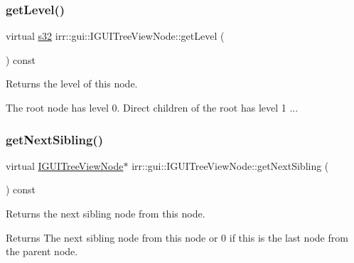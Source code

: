 \subsubsection{\texorpdfstring{get\+Level()}{getLevel()}}
{\footnotesize\ttfamily virtual \hyperlink{namespaceirr_ac66849b7a6ed16e30ebede579f9b47c6}{s32} irr\+::gui\+::\+I\+G\+U\+I\+Tree\+View\+Node\+::get\+Level (\begin{DoxyParamCaption}{ }\end{DoxyParamCaption}) const\hspace{0.3cm}{\ttfamily [pure virtual]}}



Returns the level of this node. 

The root node has level 0. Direct children of the root has level 1 ... \mbox{\label{classirr_1_1gui_1_1IGUITreeViewNode_a5f54e1386055ad0b45775ebefb1b5600}} 
\subsubsection{\texorpdfstring{get\+Next\+Sibling()}{getNextSibling()}}
{\footnotesize\ttfamily virtual \hyperlink{classirr_1_1gui_1_1IGUITreeViewNode}{I\+G\+U\+I\+Tree\+View\+Node}$\ast$ irr\+::gui\+::\+I\+G\+U\+I\+Tree\+View\+Node\+::get\+Next\+Sibling (\begin{DoxyParamCaption}{ }\end{DoxyParamCaption}) const\hspace{0.3cm}{\ttfamily [pure virtual]}}



Returns the next sibling node from this node. 

\begin{DoxyReturn}{Returns}
The next sibling node from this node or 0 if this is the last node from the parent node. 
\end{DoxyReturn}
\mbox{\label{classirr_1_1gui_1_1IGUITreeViewNode_add12cd0ee7b12a49c0f140741f9449fb}} 
